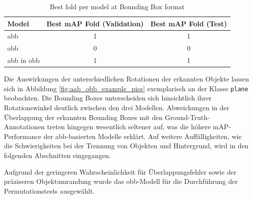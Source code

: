 \begin{table}[h]
\centering
\begin{tabular}{l c c}
\hline
\textbf{Model} & \textbf{Best mAP Fold (Validation)} & \textbf{Best mAP Fold (Test)} \\ 
\hline
abb &  1 & 1 \\
obb &  0 & 0 \\
abb in obb &  1 & 1 \\
\hline
\end{tabular}
\caption{Best fold per model at Bounding Box format}
\label{tab:best_folds_area}
\end{table}


Die Auswirkungen der unterschiedlichen Rotationen der erkannten Objekte lassen sich in Abbildung \ref{fig:aab_obb_example_pics} exemplarisch an der Klasse \texttt{plane} beobachten. Die Bounding Boxes unterscheiden sich hinsichtlich ihrer Rotationswinkel deutlich zwischen den drei Modellen. Abweichungen in der Überlappung der erkannten Bounding Boxes mit den Ground-Truth-Annotationen treten hingegen wesentlich seltener auf, was die höhere \acrshort{mAP}-Performance der \acrshort{abb}-basierten Modelle erklärt. Auf weitere Auffälligkeiten, wie die Schwierigkeiten bei der Trennung von Objekten und Hintergrund, wird in den folgenden Abschnitten eingegangen.  

Aufgrund der geringeren Wahrscheinlichkeit für Überlappungsfehler sowie der präziseren Objektumrandung wurde das \acrshort{obb}-Modell für die Durchführung der Permutationstests ausgewählt.




